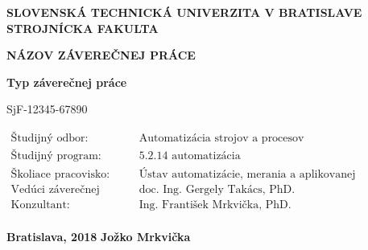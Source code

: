 \thispagestyle{empty}

\noindent \begin{center}
\textbf{{\large{}SLOVENSKÁ TECHNICKÁ UNIVERZITA V BRATISLAVE}}\\
\textbf{{\large{}STROJNÍCKA FAKULTA}}\textbf{\large{} }\\
\vspace{3cm}
\par\end{center}

\noindent \begin{center}
\vspace{3cm}
\par\end{center}



\begin{center}
\textbf{\textsc{\Large{}NÁZOV ZÁVEREČNEJ PRÁCE}}\\
\par\end{center}{\Large \par}

\begin{center}
\textbf{\large{}Typ záverečnej práce}\\
\par\end{center}{\large \par}

\begin{center}
{\large{}SjF-12345-67890}\\
\end{center}


\vfill
\begin{flushleft}
$\begin{array}{ll}
\text{Študijný odbor:}&\text{Automatizácia strojov a procesov}\\
\text{Študijný program:}&\text{5.2.14 automatizácia}\\
\text{Školiace pracovisko:}&\text{Ústav automatizácie, merania a aplikovanej informatiky}\\
\text{Vedúci záverečnej práce:}&\text{doc. Ing. Gergely Takács, PhD.}\\
\text{Konzultant:}&\text{Ing. František Mrkvička, PhD.}\\
\end{array}$
\end{flushleft}
\vspace{0.5cm}
\noindent \textbf{\large{}Bratislava, 2018} \hfill \textbf{\large{}Jožko Mrkvička}
\cleardoublepage
